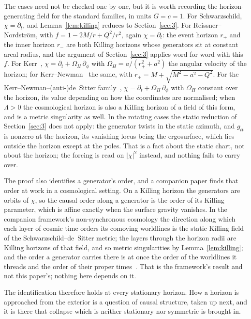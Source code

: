 \documentclass[11pt,a4paper]{article}
\theoremstyle{plain}
\theoremstyle{remark}
\begin{document}
The cases need not be checked one by one, but it is worth recording the horizon-generating field for the standard families, in units $G=c=1$. For Schwarzschild, $\chi=\partial_t$, and Lemma~\ref{lem:killing} reduces to Section~\ref{sec:3}. For Reissner--Nordstr\"om, with $f=1-2M/r+Q^{2}/r^{2}$, again $\chi=\partial_t$: the event horizon $r_+$ and the inner horizon $r_-$ are both Killing horizons whose generators sit at constant areal radius, and the argument of Section~\ref{sec:3} applies word for word with this $f$. For Kerr~\cite{Kerr1963}, $\chi=\partial_t+\Omega_H\,\partial_\phi$ with $\Omega_H=a/(r_+^{2}+a^{2})$ the angular velocity of the horizon; for Kerr--Newman~\cite{Newman1965} the same, with $r_+=M+\sqrt{M^{2}-a^{2}-Q^{2}}$. For the Kerr--Newman--(anti-)de~Sitter family~\cite{Carter1968}, $\chi=\partial_t+\Omega_H\,\partial_\phi$ with $\Omega_H$ constant over the horizon, its value depending on how the coordinates are normalised; when $\Lambda>0$ the cosmological horizon is also a Killing horizon of a field of this form, and is a metric singularity as well. In the rotating cases the static reduction of Section~\ref{sec:3} does not apply: the generator twists in the static azimuth, and $g_{tt}$ is nonzero at the horizon, its vanishing locus being the ergosurface, which lies outside the horizon except at the poles. That is a fact about the static chart, not about the horizon; the forcing is read on $|\chi|^{2}$ instead, and nothing fails to carry over.

The proof also identifies a generator's order, and a companion paper finds that order at work in a cosmological setting. On a Killing horizon the generators are orbits of $\chi$, so the causal order along a generator is the order of its Killing parameter, which is affine exactly when the surface gravity vanishes. In the companion framework's non-synchronous cosmology the direction along which each layer of cosmic time orders its comoving worldlines is the static Killing field of the Schwarzschild--de~Sitter metric; the layers through the horizon radii are Killing horizons of that field, and so metric singularities by Lemma~\ref{lem:killing}; and the order a generator carries there is at once the order of the worldlines it threads and the order of their proper times~\cite{JanzenCRframework}. That is the framework's result and not this paper's; nothing here depends on it.

The identification therefore holds at every stationary horizon. How a horizon is approached from the exterior is a question of causal structure, taken up next, and it is there that collapse which is neither stationary nor symmetric is brought in.
\end{document}
